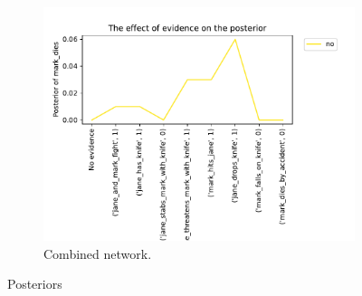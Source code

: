 \begin{enumerate}
\begin{figure}[htbp]
\begin{subfigure}{.5\textwidth}
\centering
\includegraphics[width=0.95\linewidth]{../experiments/VlekNetwork/plots/posterior_base_networkKBFull.pdf}
\caption{Combined network.}
\label{fulla}
\end{subfigure}
\caption{Posteriors}
\end{figure}

\end{enumerate}

